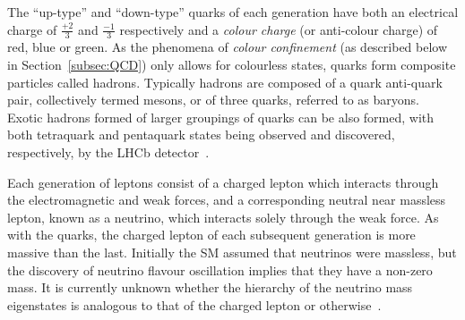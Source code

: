 The ``up-type'' and ``down-type'' quarks of each generation have both an electrical charge of $\frac{+2}{3}$ and $\frac{-1}{3}$  respectively and a \emph{colour charge} (or anti-colour charge) of red, blue or green.
As the phenomena of \emph{colour confinement} (as described below in Section~\ref{subsec:QCD}) only allows for colourless states, quarks form composite particles called hadrons.
Typically hadrons are composed of a quark anti-quark pair, collectively termed mesons, or of three quarks, referred to as baryons.
Exotic hadrons formed of larger groupings of quarks can be also formed, with both tetraquark and pentaquark states being observed and discovered, respectively, by the LHCb detector~\cite{Aaij:2014jqa,Aaij:2015tga}.

Each generation of leptons consist of a charged lepton which interacts through the electromagnetic and weak forces, and a corresponding neutral near massless lepton, known as a neutrino, which interacts solely through the weak force.
As with the quarks, the charged lepton of each subsequent generation is more massive than the last.
Initially the SM assumed that neutrinos were massless, but the discovery of neutrino flavour oscillation implies that they have a non-zero mass. 
It is currently unknown whether the hierarchy of the neutrino mass eigenstates is analogous to that of the charged lepton or otherwise~\cite{Nath:2018rqn}.

